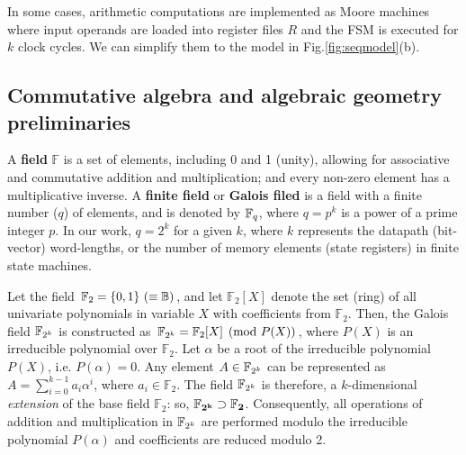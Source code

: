 \begin{figure}[hbt]
\end{figure}
In some cases, arithmetic computations are implemented as Moore machines where input operands
are loaded into register files $R$ and the FSM is executed for $k$ clock cycles.
We can simplify them to the model in Fig.\ref{fig:seqmodel}(b).

\subsection{Commutative algebra and algebraic geometry preliminaries}
A {\bf field} $\mathbb{F}$ is a set of elements, including 0 and 1 (unity),
allowing for associative and commutative addition and multiplication;
and every non-zero element has a multiplicative inverse.  A {\bf
  finite field} or {\bf Galois filed} is a field with a finite number
($q$) of elements, and is denoted by ${\mathbb{F}}_{q}$, where $q=p^k$ is a power of
a prime integer $p$. In our work, $q = 2^k$ for
a given $k$, where $k$ represents the datapath (bit-vector)
word-lengths, or the number of memory elements (state registers) in
finite state machines. 

Let the field $\mathbb{F}_2 = \{0, 1\} ~(\equiv {\mathbb{B}})$, and let
$\mathbb{F}_2[X]$ denote the set (ring) of all univariate polynomials
in variable $X$ with coefficients from $\mathbb{F}_2$. Then, the
Galois field ${\mathbb{F}}_{2^k}$ is constructed as ${\mathbb{F}}_{2^k} = \mathbb{F}_2[X] \pmod{
  P(X)}$, where $P(X)$ is an irreducible polynomial over
$\mathbb{F}_2$. Let $\alpha$ be a root of the irreducible polynomial
$P(X)$, i.e. $P(\alpha) = 0$. Any element $A \in {\mathbb{F}}_{2^k}$ can be
represented as $A = \sum_{i=0}^{k-1} a_i \alpha^i$, where $a_i \in
\mathbb{F}_2$. The field ${\mathbb{F}}_{2^k}$ is therefore, a $k$-dimensional {\it
  extension} of the base field $\mathbb{F}_2$: so,  $\mathbf{{\mathbb{F}}_{2^k} \supset
\mathbb{F}_2}$. Consequently, all operations of addition and
multiplication in ${\mathbb{F}}_{2^k}$ are performed modulo the irreducible
polynomial $P(\alpha)$ and coefficients are reduced modulo 2.  

